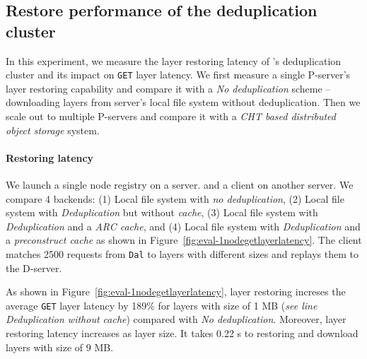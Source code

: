 

\subsection{Restore performance of the deduplication cluster}
\label{sec:eval-dedup}




In this experiment,
we measure the layer restoring latency of \sysname's deduplication cluster
and its impact on \texttt{GET} layer latency.
We first measure a single P-server's layer restoring capability
and compare it with a \emph{No deduplication} scheme --
downloading layers from server's local file system without deduplication.
Then we scale out to multiple P-servers
and compare it with a \emph{CHT based distributed object storage} system.
%
%

\paragraph{Restoring latency}
We launch a single node registry on a server.
and a client on another server.
We compare 4 backends:
(1) Local file system with \emph{no deduplication},
(2) Local file system with \sysname \emph{Deduplication} but without \emph{cache},
(3) Local file system with \sysname \emph{Deduplication} and a \emph{ARC cache}, and
(4) Local file system with \sysname \emph{Deduplication} and a \sysname \emph{preconstruct cache}
as shown in Figure~\ref{fig:eval-1nodegetlayerlatency}.
%
The client matches 2500 requests from \texttt{Dal} to layers with different sizes
and replays them to the D-server.

As shown in Figure~\ref{fig:eval-1nodegetlayerlatency},
layer restoring increses the average \texttt{GET} layer latency by 189\% for layers with size of 1 MB
 (\emph{see line Deduplication without cache})
compared with \emph{No deduplication}.
Moreover,
layer restoring latency increases as layer size.
It takes 0.22 s to restoring and download layers with size of 9 MB.

